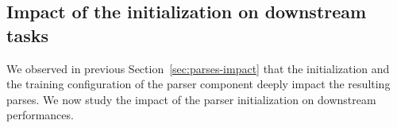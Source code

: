 
\subsection{Impact of the initialization on downstream tasks} %
\label{sec:dowstream-impact}

We observed in previous Section~\ref{sec:parses-impact} that the initialization and the training configuration of the parser component deeply impact the resulting parses. We now study the impact of the parser initialization on downstream performances.


